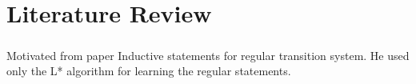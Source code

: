 \chapter{Literature Review}\label{chapter:literature_review}

\paragraph{}
Motivated from paper Inductive statements for regular transition system.
He used only the L* algorithm for learning the regular statements.
